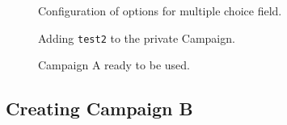 \documentclass{article}
\begin{document}
		\begin{figure}[ht]
			\centering
			\caption{Configuration of options for multiple choice field.}
			\label{fig:eval-ca-5}
		\end{figure}


		\begin{figure}[ht]
			\centering
			\caption{Adding \texttt{test2} to the private Campaign.}
			\label{fig:eval-ca-6}
		\end{figure}

		\begin{figure}[ht]
			\centering
			\caption{Campaign A ready to be used.}
			\label{fig:eval-ca-4}
		\end{figure}

		\FloatBarrier
		\subsection{Creating Campaign B}
\end{document}

